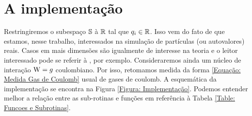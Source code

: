 \section{A implementação}

Restringiremos o subespaço $\mathbb{S}$ à $\mathbb{R}$ tal que $q_i \in \mathbb{R}$. Isso vem do fato de que estamos, nesse trabalho, interessados na simulação de partículas (ou autovalores) reais. Casos em mais dimensões são igualmente de interesse na teoria e o leitor interessado pode se referir à \cite{tao2008random}, por exemplo. Consideraremos ainda um núcleo de interação $\operatorname{W} = g$ coulombiano. Por isso, retomamos medida da forma \ref{Equação: Medida Gas de Coulomb} usual de gases de coulomb. A esquemática da implementação se encontra na Figura \ref{Figura: Implementação}. Podemos entender melhor a relação entre as sub-rotinas e funções em referência à Tabela \ref{Table: Funcoes e Subrotinas}.

